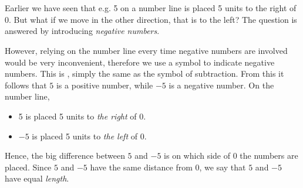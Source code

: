 




\section{\negintro}
Earlier we have seen that e.g. 5 on a number line is placed 5 units to the right of 0. 
But what if we move in the other direction, that is to the left? The question is answered by introducing \textit{negative numbers}.\regv

\vsk 
However, relying on the number line every time negative numbers are involved would be very inconvenient, therefore we use a symbol to indicate negative numbers. This is \sym{$ - $}, simply the same as the symbol of subtraction. From this it follows that $ 5 $ is a positive number, while $ -5 $ is a negative number. On the number line,
\begin{itemize}
	\item 5 is placed 5 units to \textsl{the right} of 0.
	\item $ -5 $ is placed 5 units to \textsl{the left} of 0.
\end{itemize}
Hence, the big difference between $ 5 $ and $ -5 $ is on which side of 0 the numbers are placed. Since $ 5 $ and $ -5 $ have the same distance from 0, we say that $ 5 $ and $ -5 $ have equal \textit{length}. \regv

\eks[1]{ \vs \vs
\[ |27|=27 \]
}
\eks[2]{ \vs \vs
\[ |-27|=27 \]
}
\newpage
